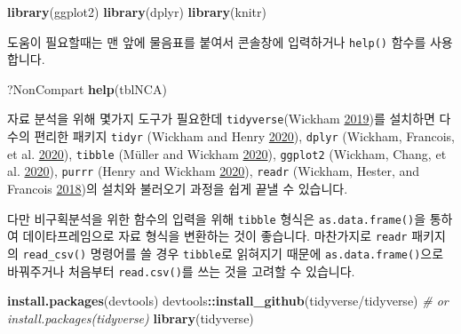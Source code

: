 \documentclass[
  12pt,
]{krantz}
\newenvironment{Shaded}{\begin{snugshade}}{\end{snugshade}}
\newcommand{\CommentTok}[1]{\textcolor[rgb]{0.56,0.35,0.01}{\textit{#1}}}
\newcommand{\KeywordTok}[1]{\textcolor[rgb]{0.13,0.29,0.53}{\textbf{#1}}}
\newcommand{\NormalTok}[1]{#1}
\newcommand{\OperatorTok}[1]{\textcolor[rgb]{0.81,0.36,0.00}{\textbf{#1}}}
\newcommand{\StringTok}[1]{\textcolor[rgb]{0.31,0.60,0.02}{#1}}
\begin{document}
\begin{Shaded}
\begin{Highlighting}[]
\KeywordTok{library}\NormalTok{(ggplot2) }
\KeywordTok{library}\NormalTok{(dplyr) }
\KeywordTok{library}\NormalTok{(knitr) }
\end{Highlighting}
\end{Shaded}

도움이 필요할때는 맨 앞에 물음표를 붙여서 콘솔창에 입력하거나 \texttt{help()} 함수를 사용합니다.

\begin{Shaded}
\begin{Highlighting}[]
\NormalTok{?NonCompart}
\KeywordTok{help}\NormalTok{(tblNCA)}
\end{Highlighting}
\end{Shaded}

자료 분석을 위해 몇가지 도구가 필요한데 \texttt{tidyverse}(Wickham \protect\hyperlink{ref-R-tidyverse}{2019})를 설치하면 다수의 편리한 패키지 \texttt{tidyr} (Wickham and Henry \protect\hyperlink{ref-R-tidyr}{2020}), \texttt{dplyr} (Wickham, Francois, et al. \protect\hyperlink{ref-R-dplyr}{2020}), \texttt{tibble} (Müller and Wickham \protect\hyperlink{ref-R-tibble}{2020}), \texttt{ggplot2} (Wickham, Chang, et al. \protect\hyperlink{ref-R-ggplot2}{2020}), \texttt{purrr} (Henry and Wickham \protect\hyperlink{ref-R-purrr}{2020}), \texttt{readr} (Wickham, Hester, and Francois \protect\hyperlink{ref-R-readr}{2018})의 설치와 불러오기 과정을 쉽게 끝낼 수 있습니다.

다만 비구획분석을 위한 함수의 입력을 위해 \texttt{tibble} 형식은 \texttt{as.data.frame()}을 통하여 데이타프레임으로 자료 형식을 변환하는 것이 좋습니다.
마찬가지로 \texttt{readr} 패키지의 \texttt{read\_csv()} 명령어를 쓸 경우 \texttt{tibble}로 읽혀지기 때문에 \texttt{as.data.frame()}으로 바꿔주거나 처음부터 \texttt{read.csv()}를 쓰는 것을 고려할 수 있습니다.

\begin{Shaded}
\begin{Highlighting}[]
\KeywordTok{install.packages}\NormalTok{(}\StringTok{\textquotesingle{}devtools\textquotesingle{}}\NormalTok{)}
\NormalTok{devtools}\OperatorTok{::}\KeywordTok{install\_github}\NormalTok{(}\StringTok{\textquotesingle{}tidyverse/tidyverse\textquotesingle{}}\NormalTok{) }
\CommentTok{\# or \textasciigrave{}install.packages(\textquotesingle{}tidyverse\textquotesingle{})\textasciigrave{}}
\KeywordTok{library}\NormalTok{(tidyverse)}
\end{Highlighting}
\end{Shaded}
\end{document}
